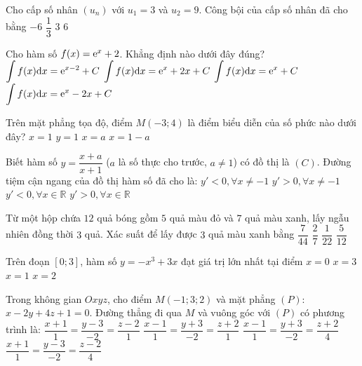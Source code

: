 \begin{ex}%
Cho cấp số nhân $\left(u_n\right)$ với $u_1=3$ và $u_2=9$. Công bội của cấp số nhân đã cho bằng
\choice
{$-6$}
{$\dfrac{1}{3}$}
{\True $3$}
{$6$}

\end{ex}
\begin{ex}%
Cho hàm số $f(x)={\rm e}^{x}+2$. Khẳng định nào dưới đây đúng?
\choice
{$\displaystyle\displaystyle\int f(x) \mathrm{d} x={\rm e}^{x-2}+C$}
{\True $\displaystyle\displaystyle\int f(x) \mathrm{d} x={\rm e}^{x}+2 x+C$}
{$\displaystyle\displaystyle\int f(x) \mathrm{d} x={\rm e}^{x}+C$}
{$\displaystyle\displaystyle\int f(x) \mathrm{d} x={\rm e}^{x}-2 x+C$}

\end{ex}
\begin{ex}%
Trên mặt phẳng tọa độ, điểm $M(-3; 4)$ là điểm biểu diễn của số phức nào dưới đây?
\choice
{$x=1$}
{\True $y=1$}
{$x=a$}
{$x=1-a$}

\end{ex}
\begin{ex}%
Biết hàm số $y=\dfrac{x+a}{x+1}$ ($a$ là số thực cho trước, $a \neq 1$) có đồ thị là $(C)$. Đường tiệm cận ngang của đồ thị hàm số đã cho là:
\choice
{$y'<0, \forall x \neq-1$}
{\True $y'>0, \forall x \neq-1$}
{$y'<0, \forall x \in \mathbb{R}$}
{$y'>0, \forall x \in \mathbb{R}$}

\end{ex}
\begin{ex}%
Từ một hộp chứa $12$ quả bóng gồm $5$ quả màu đỏ và $7$ quả màu xanh, lấy ngẫu nhiên đồng thời $3$ quả. Xác suất để lấy được $3$ quả màu xanh bằng
\choice
{\True $\dfrac{7}{44}$}
{$\dfrac{2}{7}$}
{$\dfrac{1}{22}$}
{$\dfrac{5}{12}$}

\end{ex}
\begin{ex}%
Trên đoạn $[0; 3]$, hàm số $y=-x^3+3 x$ đạt giá trị lớn nhất tại điểm
\choice
{$x=0$}
{$x=3$}
{\True $x=1$}
{$x=2$}

\end{ex}
\begin{ex}%
Trong không gian $O x y z$, cho điểm $M(-1; 3; 2)$ và mặt phẳng $(P)$: $x-2 y+4 z+1=0$. Đường thẳng đi qua $M$ và vuông góc với $(P)$ có phương trình là:
\choice
{$\dfrac{x+1}{1}=\dfrac{y-3}{-2}=\dfrac{z-2}{1}$}
{$\dfrac{x-1}{1}=\dfrac{y+3}{-2}=\dfrac{z+2}{1}$}
{$\dfrac{x-1}{1}=\dfrac{y+3}{-2}=\dfrac{z+2}{4}$}
{\True $\dfrac{x+1}{1}=\dfrac{y-3}{-2}=\dfrac{z-2}{4}$}

\end{ex}
